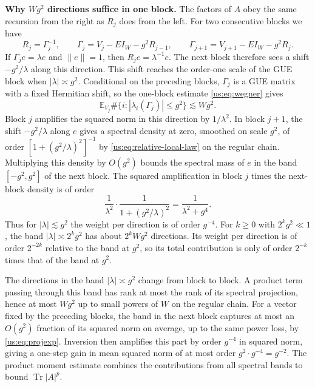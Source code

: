 \documentclass[11pt]{article}
\numberwithin{equation}{section}
\theoremstyle{remark}
\newcommand{\E}{\mathbb E}
\newcommand{\Tr}{\operatorname{Tr}}
\begin{document}
\textbf{Why $Wg^2$ directions suffice in one block.}
The factors of $A$ obey the same recursion from the right as $R_j$
does from the left. For two consecutive blocks we have
\[
 R_j=\Gamma_j^{-1},\qquad \Gamma_j=V_j-EI_W-g^2R_{j-1},
 \qquad \Gamma_{j+1}=V_{j+1}-EI_W-g^2R_j.
\]
If $\Gamma_j e=\lambda e$ and $\|e\|=1$, then $R_j e=\lambda^{-1}e$.
The next block therefore sees a shift $-g^2/\lambda$ along this direction.
This shift reaches the order-one scale of the GUE block when
$|\lambda|\asymp g^2$. Conditional on the preceding blocks,
$\Gamma_j$ is a GUE matrix with a fixed Hermitian shift, so the
one-block estimate \eqref{us:eq:wegner} gives
\[
 \E_{V_j}\#\{i:|\lambda_i(\Gamma_j)|\le g^2\}\lesssim Wg^2 .
\]
Block $j$ amplifies the squared norm in this direction by $1/\lambda^2$.
In block $j+1$, the shift $-g^2/\lambda$ along $e$ gives a spectral
density at zero, smoothed on scale $g^2$, of order
$[1+(g^2/\lambda)^2]^{-1}$ by \eqref{us:eq:relative-local-law} on
the regular chain. Multiplying this density by $O(g^2)$ bounds the
spectral mass of $e$ in the band $[-g^2,g^2]$ of the next block.
The squared amplification in block $j$ times the next-block density
is of order
\[
 \frac{1}{\lambda^2}\cdot\frac{1}{1+(g^2/\lambda)^2}
 =\frac{1}{\lambda^2+g^4}.
\]
Thus for $|\lambda|\lesssim g^2$ the weight per direction is of
order $g^{-4}$. For $k\ge0$ with $2^kg^2\ll1$, the band $|\lambda|\asymp 2^kg^2$
has about $2^k Wg^2$ directions. Its weight per direction is of
order $2^{-2k}$ relative to the band at $g^2$, so its
total contribution is only of order $2^{-k}$ times that of the
band at $g^2$.

The directions in the band $|\lambda|\asymp g^2$ change from block to
block. A product term passing through this band has rank at most
the rank of its spectral projection, hence at most $Wg^2$ up to
small powers of $W$ on the regular chain. For a vector fixed by the
preceding blocks, the band in the next block captures at most an
$O(g^2)$ fraction of its squared norm on average, up to the same
power loss, by \eqref{us:eq:projexp}. Inversion then amplifies this
part by order $g^{-4}$ in squared norm, giving a one-step gain in
mean squared norm of at most order $g^2\cdot g^{-4}=g^{-2}$.
The product moment estimate combines the contributions from all
spectral bands to bound $\Tr|A|^p$.
\end{document}
